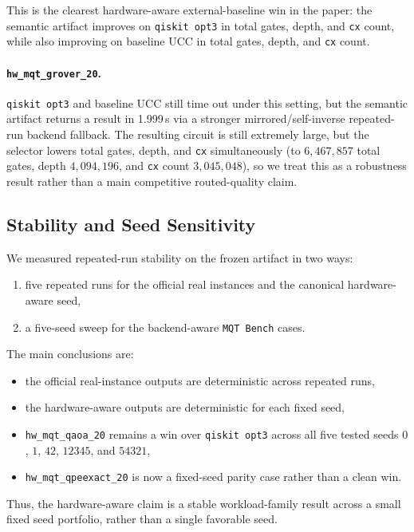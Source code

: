 \documentclass[11pt]{article}
\begin{document}
This is the clearest hardware-aware external-baseline win in the paper: the
semantic artifact improves on \texttt{qiskit opt3} in total gates, depth, and
\texttt{cx} count, while also improving on baseline UCC in total gates, depth,
and \texttt{cx} count.

\paragraph{\texttt{hw\_mqt\_grover\_20}.}
\texttt{qiskit opt3} and baseline UCC still time out under this setting,
but the semantic artifact returns a result in 1.999\,s via a stronger
mirrored/self-inverse repeated-run backend fallback. The resulting circuit is
still extremely large, but the selector lowers total gates, depth, and
\texttt{cx} simultaneously (to $6{,}467{,}857$ total gates, depth
$4{,}094{,}196$, and \texttt{cx} count $3{,}045{,}048$), so we treat this as a
robustness result rather than a main competitive routed-quality claim.

\subsection{Stability and Seed Sensitivity}

We measured repeated-run stability on the frozen artifact in two ways:
\begin{enumerate}[leftmargin=1.5em]
    \item five repeated runs for the official real instances and the canonical hardware-aware seed,
    \item a five-seed sweep for the backend-aware \texttt{MQT Bench} cases.
\end{enumerate}

The main conclusions are:
\begin{itemize}[leftmargin=1.5em]
    \item the official real-instance outputs are deterministic across repeated runs,
    \item the hardware-aware outputs are deterministic for each fixed seed,
    \item \texttt{hw\_mqt\_qaoa\_20} remains a win over \texttt{qiskit opt3} across all five tested seeds $0$, $1$, $42$, $12345$, and $54321$,
    \item \texttt{hw\_mqt\_qpeexact\_20} is now a fixed-seed parity case rather than a clean win.
\end{itemize}
Thus, the hardware-aware claim is a stable workload-family result across a small
fixed seed portfolio, rather than a single favorable seed.
\end{document}
